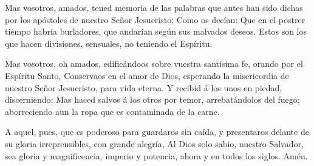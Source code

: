  Mas vosotros, amados, tened memoria de las palabras que
antes han sido dichas por los apóstoles de nuestro Señor Jesucristo;
 Como os decían: Que en el postrer tiempo habría
burladores, que andarían según sus malvados deseos.  Estos
son los que hacen divisiones, sensuales, no teniendo el Espíritu.

 Mas vosotros, oh amados, edificándoos sobre vuestra
santísima fe, orando por el Espíritu Santo,  Conservaos en
el amor de Dios, esperando la misericordia de nuestro Señor Jesucristo,
para vida eterna.  Y recibid á los unos en piedad,
discerniendo:  Mas haced salvos á los otros por temor,
arrebatándolos del fuego; aborreciendo aun la ropa que es contaminada de
la carne.

 A aquel, pues, que es poderoso para guardaros sin caída, y
presentaros delante de su gloria irreprensibles, con grande alegría,
 Al Dios solo sabio, nuestro Salvador, sea gloria y
magnificencia, imperio y potencia, ahora y en todos los siglos. Amén.
